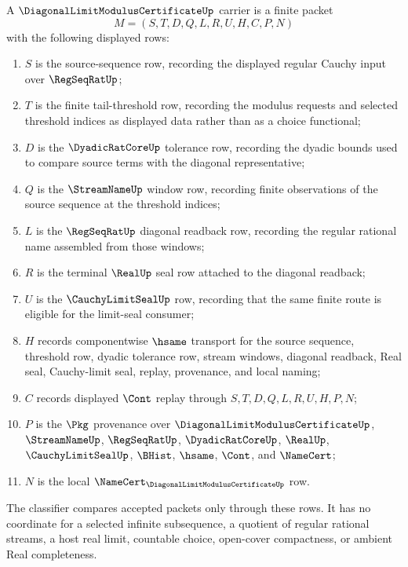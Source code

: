 \begin{definition}
\label{def:diagonal-limit-modulus-certificate-carrier}
A $\DiagonalLimitModulusCertificateUp$ carrier is a finite packet
$$
M=(S,T,D,Q,L,R,U,H,C,P,N)
$$
with the following displayed rows:
\begin{enumerate}
\item $S$ is the source-sequence row, recording the displayed regular Cauchy input over $\RegSeqRatUp$;
\item $T$ is the finite tail-threshold row, recording the modulus requests and selected threshold indices as displayed data rather than as a choice functional;
\item $D$ is the $\DyadicRatCoreUp$ tolerance row, recording the dyadic bounds used to compare source terms with the diagonal representative;
\item $Q$ is the $\StreamNameUp$ window row, recording finite observations of the source sequence at the threshold indices;
\item $L$ is the $\RegSeqRatUp$ diagonal readback row, recording the regular rational name assembled from those windows;
\item $R$ is the terminal $\RealUp$ seal row attached to the diagonal readback;
\item $U$ is the $\CauchyLimitSealUp$ row, recording that the same finite route is eligible for the limit-seal consumer;
\item $H$ records componentwise $\hsame$ transport for the source sequence, threshold row, dyadic tolerance row, stream windows, diagonal readback, Real seal, Cauchy-limit seal, replay, provenance, and local naming;
\item $C$ records displayed $\Cont$ replay through $S,T,D,Q,L,R,U,H,P,N$;
\item $P$ is the $\Pkg$ provenance over $\DiagonalLimitModulusCertificateUp$, $\StreamNameUp$, $\RegSeqRatUp$, $\DyadicRatCoreUp$, $\RealUp$, $\CauchyLimitSealUp$, $\BHist$, $\hsame$, $\Cont$, and $\NameCert$;
\item $N$ is the local $\NameCert_{\DiagonalLimitModulusCertificateUp}$ row.
\end{enumerate}
The classifier compares accepted packets only through these rows. It has no coordinate for a selected infinite subsequence, a quotient of regular rational streams, a host real limit, countable choice, open-cover compactness, or ambient Real completeness.
\end{definition}


